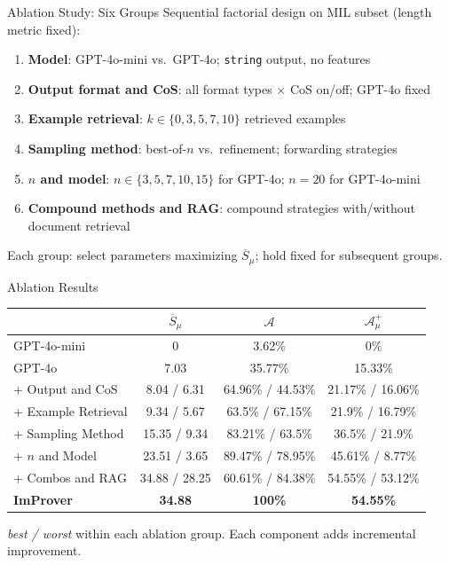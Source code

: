 \begin{frame}{Ablation Study: Six Groups}
\vspace{0.3em}
Sequential factorial design on MIL subset (length metric fixed):
\vspace{0.3em}
\begin{enumerate}\setlength{\itemsep}{5pt}
  \item \textbf{Model}: GPT-4o-mini vs.\ GPT-4o; \texttt{string} output, no features
  \item \textbf{Output format and CoS}: all format types $\times$ CoS on/off; GPT-4o fixed
  \item \textbf{Example retrieval}: $k \in \{0, 3, 5, 7, 10\}$ retrieved examples
  \item \textbf{Sampling method}: best-of-$n$ vs.\ refinement; forwarding strategies
  \item \textbf{$n$ and model}: $n \in \{3, 5, 7, 10, 15\}$ for GPT-4o; $n=20$ for GPT-4o-mini
  \item \textbf{Compound methods and RAG}: compound strategies with/without document retrieval
\end{enumerate}
\vspace{0.3em}
\small Each group: select parameters maximizing $\overline{S}_\mu$; hold fixed for subsequent groups.
\end{frame}

\begin{frame}{Ablation Results}
\vspace{0.3em}
\begin{center}
\small
\begin{tabular}{l|ccc}
\toprule
& $\overline{S}_\mu$ & $\mathcal{A}$ & $\mathcal{A}^+_\mu$\\
\midrule
GPT-4o-mini & 0 & 3.62\% & 0\%\\
GPT-4o & 7.03 & 35.77\% & 15.33\%\\
+ Output and CoS & 8.04 / 6.31 & 64.96\% / 44.53\% & 21.17\% / 16.06\%\\
+ Example Retrieval & 9.34 / 5.67 & 63.5\% / 67.15\% & 21.9\% / 16.79\%\\
+ Sampling Method & 15.35 / 9.34 & 83.21\% / 63.5\% & 36.5\% / 21.9\%\\
+ $n$ and Model & 23.51 / 3.65 & 89.47\% / 78.95\% & 45.61\% / 8.77\%\\
+ Combos and RAG & 34.88 / 28.25 & 60.61\% / 84.38\% & 54.55\% / 53.12\%\\
\midrule
\textbf{ImProver} & \textbf{34.88} & \textbf{100\%} & \textbf{54.55\%}\\
\bottomrule
\end{tabular}
\end{center}
\vspace{0.3em}
\small \emph{best / worst} within each ablation group. Each component adds incremental improvement.
\end{frame}

